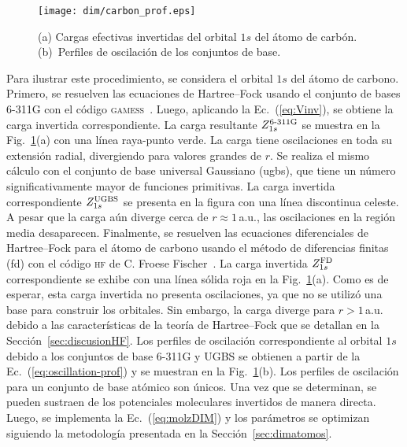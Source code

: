 \begin{figure}[t]
\centering
\texttt{[image: dim/carbon\_prof.eps]}
\caption[Inversión de orbitales descriptos con conjuntos de base 
finitos.]
{(a) Cargas efectivas invertidas del orbital $1s$ del átomo de carbón.
(b)~Perfiles de oscilación de los conjuntos de base.}
\label{fig:1sCarbon}
\end{figure}

Para ilustrar este procedimiento, se considera el orbital $1s$ del átomo 
de carbono. Primero, se resuelven las ecuaciones de Hartree--Fock usando 
el conjunto de bases \mbox{6-311G} con el código 
\textsc{gamess}~\cite{Schmidt:93,Gordon:05}. Luego, aplicando la 
Ec.~(\ref{eq:Vinv}), se obtiene la carga invertida correspondiente. La 
carga resultante $Z_{1s}^{\mbox{\scriptsize 6-311G}}$ se muestra en la 
Fig.~\ref{fig:1sCarbon}(a) con una línea raya-punto verde. La carga 
tiene oscilaciones en toda su extensión radial, divergiendo para valores 
grandes de $r$. Se realiza el mismo cálculo con el conjunto de base 
universal Gaussiano (\acs{ugbs}), que tiene un número significativamente 
mayor de funciones primitivas. La carga invertida correspondiente 
$Z_{1s}^{\mbox{\scriptsize UGBS}}$ se presenta en la figura con una 
línea discontinua celeste. A pesar que la carga aún diverge cerca de 
$r\approx1\,$a.u., las oscilaciones en la región media desaparecen. 
Finalmente, se resuelven las ecuaciones diferenciales de Hartree--Fock 
para el átomo de carbono usando el método de diferencias finitas 
(\acs{fd}) con el código \textsc{hf} de C. Froese 
Fischer~\cite{FroeseFischer:97}. La carga invertida 
$Z_{1s}^{\mbox{\scriptsize FD}}$ correspondiente se exhibe con una línea 
sólida roja en la Fig.~\ref{fig:1sCarbon}(a). Como es de esperar, esta 
carga invertida no presenta oscilaciones, ya que no se utilizó una base 
para construir los orbitales. Sin embargo, la carga diverge para 
$r>1\,$a.u. debido a las características de la teoría de Hartree--Fock 
que se detallan en la Sección~\ref{sec:discusionHF}. Los perfiles de 
oscilación correspondiente al orbital $1s$ debido a los conjuntos de 
base \mbox{6-311G} y UGBS se obtienen a partir de la 
Ec.~(\ref{eq:oscillation-prof}) y se muestran en la 
Fig.~\ref{fig:1sCarbon}(b). Los perfiles de oscilación para un conjunto 
de base atómico son únicos. Una vez que se determinan, se pueden 
sustraen de los potenciales moleculares invertidos de manera directa. 
Luego, se implementa la Ec.~(\ref{eq:molzDIM}) y los parámetros 
se optimizan siguiendo la metodología presentada en la 
Sección~\ref{sec:dimatomos}.

